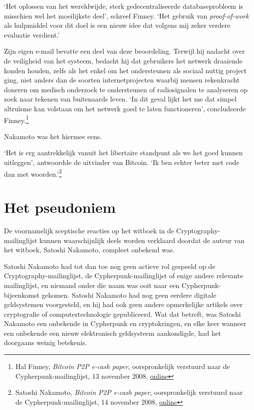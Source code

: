 \documentclass[
  a5paper,
  smalldemyvopaper,11pt,twoside,onecolumn,openright,extrafontsizes,
hidelinks]{memoir}
\begin{document}
`Het oplossen van het wereldwijde, sterk gedecentraliseerde
databaseprobleem is misschien wel het moeilijkste deel', schreef Finney.
`Het gebruik van \emph{proof-of-work} als hulpmiddel voor dit doel is
een nieuw idee dat volgens mij zeker verdere evaluatie verdient.'

Zijn eigen e-mail bevatte een deel van deze beoordeling. Terwijl hij
nadacht over de veiligheid van het systeem, bedacht hij dat gebruikers
het netwerk draaiende konden houden, zelfs als het enkel om het
ondersteunen als sociaal nuttig project ging, niet anders dan de soorten
internetprojecten waarbij mensen rekenkracht doneren om medisch
onderzoek te ondersteunen of radiosignalen te analyseren op zoek naar
tekenen van buitenaards leven. `In dit geval lijkt het me dat simpel
altruïsme kan volstaan om het netwerk goed te laten functioneren',
concludeerde Finney.\footnote{Hal Finney, \emph{Bitcoin P2P e-cash
  paper}, oorspronkelijk verstuurd naar de Cypherpunk-mailinglijst, 13
  november 2008,
  \href{https://www.metzdowd.com/pipermail/cryptography/2008-November/014848.html}{online}}

Nakamoto was het hiermee eens.

`Het is erg aantrekkelijk vanuit het libertaire standpunt als we het
goed kunnen uitleggen', antwoordde de uitvinder van Bitcoin. `Ik ben
echter beter met code dan met woorden.'\footnote{Satoshi Nakamoto,
  \emph{Bitcoin P2P e-cash paper}, oorspronkelijk verstuurd naar de
  Cypherpunk-mailinglijst, 14 november 2008,
  \href{https://www.metzdowd.com/pipermail/cryptography/2008-November/014853.html}{online}}

\section{Het pseudoniem}\label{het-pseudoniem}

De voornamelijk sceptische reacties op het witboek in de
Cryptography-mailinglijst kunnen waarschijnlijk deels worden verklaard
doordat de auteur van het witboek, Satoshi Nakamoto, compleet onbekend
was.

Satoshi Nakamoto had tot dan toe nog geen actieve rol gespeeld op de
Cryptography-mailinglijst, de Cypherpunk-mailinglijst of enige andere
relevante mailinglijst, en niemand onder die naam was ooit naar een
Cypherpunk-bijeenkomst gekomen. Satoshi Nakamoto had nog geen eerdere
digitale geldsystemen voorgesteld, en hij had ook geen andere
opmerkelijke artikels over cryptografie of computertechnologie
gepubliceerd. Wat dat betreft, was Satoshi Nakamoto een onbekende in
Cypherpunk en cryptokringen, en elke keer wanneer een onbekende een
nieuw elektronisch geldsysteem aankondigde, had het doorgaans weinig
betekenis.
\end{document}

